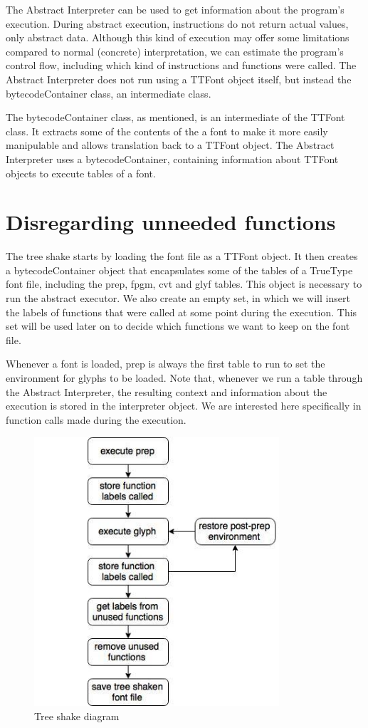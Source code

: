 \documentclass[12pt]{article}
\begin{document}
The Abstract Interpreter can be used to get information about the
program's execution. During abstract execution, instructions do not
return actual values, only abstract data. Although this kind of
execution may offer some limitations compared to normal (concrete)
interpretation, we can estimate  the program's control flow, including
which kind of instructions and functions were called. The Abstract
Interpreter does not run using a TTFont object itself, but instead the
bytecodeContainer class, an intermediate class.

The bytecodeContainer class, as mentioned, is an intermediate of
the TTFont class. It extracts some of the contents of the a font to make
it more easily manipulable and allows translation back to a TTFont
object. The Abstract Interpreter uses a bytecodeContainer, containing 
information about TTFont objects to execute tables of a font.

\section{Disregarding unneeded functions}

The tree shake starts by loading the font file as a TTFont object.
It then creates a bytecodeContainer object that encapsulates some of the 
tables of a TrueType font file, including the prep, fpgm, cvt and glyf
tables. This object is necessary to run the abstract executor. We also
create an empty set, in which we will insert the labels of functions
that were called at some point during the execution. This set will be
used later on to decide which functions we want to keep on the font file.

Whenever a font is loaded, prep is always the first table to run to 
set the environment for glyphs to be loaded. Note that, whenever we run
a table through the Abstract Interpreter, the resulting context
and information about the execution is stored in the interpreter object.
We are interested here specifically in function calls made during the execution.

\begin{figure}[ht!]
\centering
\includegraphics[height=100mm]{diagram.jpg}
\caption{Tree shake diagram \label{overflow}}
\end{figure}
\end{document}
